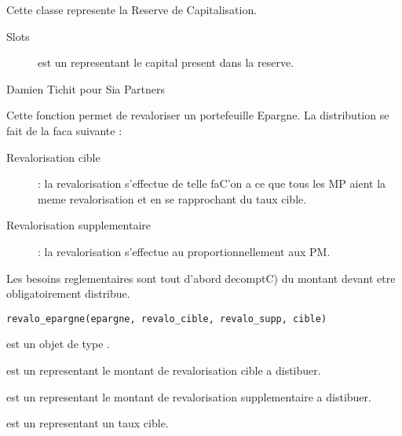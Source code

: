 \documentclass[a4paper]{book}
\begin{document}
%
\begin{Description}\relax
Cette classe represente la Reserve de Capitalisation.
\end{Description}
%
\begin{Section}{Slots}

\begin{description}

\item[] est un  representant le capital present dans la reserve.

\end{description}
\end{Section}
%
\begin{Author}\relax
Damien Tichit pour Sia Partners
\end{Author}
%
\begin{Description}\relax
Cette fonction permet de revaloriser un portefeuille Epargne. La distribution se fait de la faca suivante :
\begin{description}

\item[Revalorisation cible]  : la revalorisation s'effectue de telle faC'on a ce que tous les MP aient la meme revalorisation et en se rapprochant du taux cible.
\item[Revalorisation supplementaire]  : la revalorisation s'effectue au proportionnellement aux PM.

\end{description}

Les besoins reglementaires sont tout d'abord decomptC) du montant devant etre obligatoirement distribue.
\end{Description}
%
\begin{Usage}
\begin{verbatim}
revalo_epargne(epargne, revalo_cible, revalo_supp, cible)
\end{verbatim}
\end{Usage}
%
\begin{Arguments}
\begin{ldescription}
\item[\code{epargne}] est un objet de type .

\item[\code{revalo\_cible}] est un  representant le montant de revalorisation cible a distibuer.

\item[\code{revalo\_supp}] est un  representant le montant de revalorisation supplementaire a distibuer.

\item[\code{cible}] est un  representant un taux cible.
\end{ldescription}
\end{Arguments}
\end{document}

